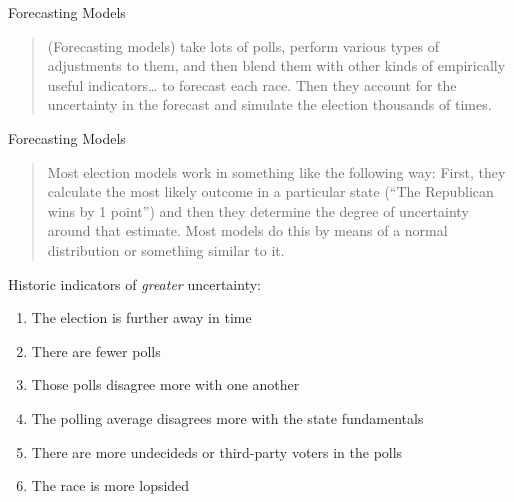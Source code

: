 \documentclass[
  ignorenonframetext,
]{beamer}
\providecommand{\tightlist}{%
  \setlength{\itemsep}{0pt}\setlength{\parskip}{0pt}}
\begin{document}
\begin{frame}{Forecasting Models}
\protect\hypertarget{forecasting-models}{}

\begin{quote}
(Forecasting models) take lots of polls, perform various types of
adjustments to them, and then blend them with other kinds of empirically
useful indicators\ldots{} to forecast each race. Then they account for
the uncertainty in the forecast and simulate the election thousands of
times.
\end{quote}

\end{frame}

\begin{frame}{Forecasting Models}
\protect\hypertarget{forecasting-models-1}{}

\begin{quote}
Most election models work in something like the following way: First,
they calculate the most likely outcome in a particular state (``The
Republican wins by 1 point'') and then they determine the degree of
uncertainty around that estimate. Most models do this by means of a
normal distribution or something similar to it.
\end{quote}

Historic indicators of \emph{greater} uncertainty:

\begin{enumerate}
\tightlist
\item
  The election is further away in time
\item
  There are fewer polls
\item
  Those polls disagree more with one another
\item
  The polling average disagrees more with the state fundamentals
\item
  There are more undecideds or third-party voters in the polls
\item
  The race is more lopsided
\end{enumerate}

\end{frame}
\end{document}

